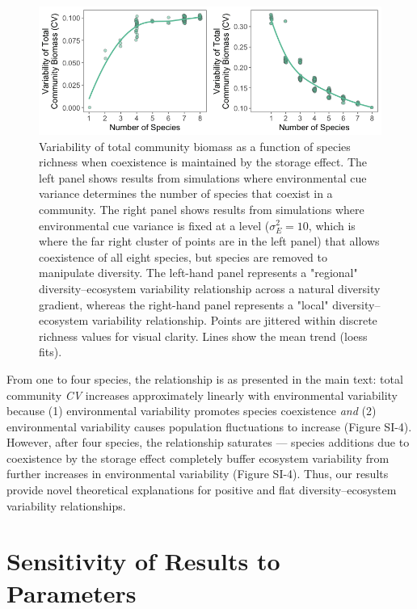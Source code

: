\documentclass[11pt,]{article}
\begin{document}
\begin{figure}[!ht]
  \centering
      \includegraphics[width=6in]{./components/SI_storage_effect_eightspp_local_regional.png}
  \caption{Variability of total community biomass as a function of species richness when coexistence is maintained by the storage effect. The left panel shows results from simulations where environmental cue variance determines the number of species that coexist in a community. The right panel shows results from simulations where environmental cue variance is fixed at a level ($\sigma_E^2=10$, which is where the far right cluster of points are in the left panel) that allows coexistence of all eight species, but species are removed to manipulate diversity. The left-hand panel represents a "regional" diversity--ecosystem variability relationship across a natural diversity gradient, whereas the right-hand panel represents a "local" diversity--ecosystem variability relationship. Points are jittered within discrete richness values for visual clarity. Lines show the mean trend (loess fits).}
\end{figure}

From one to four species, the relationship is as presented in the main
text: total community \emph{CV} increases approximately linearly with
environmental variability because (1) environmental variability promotes
species coexistence \emph{and} (2) environmental variability causes
population fluctuations to increase (Figure SI-4). However, after four
species, the relationship saturates --- species additions due to
coexistence by the storage effect completely buffer ecosystem
variability from further increases in environmental variability (Figure
SI-4). Thus, our results provide novel theoretical explanations for
positive and flat diversity--ecosystem variability relationships.

\newpage{}

\section{Sensitivity of Results to Parameters}
\end{document}

